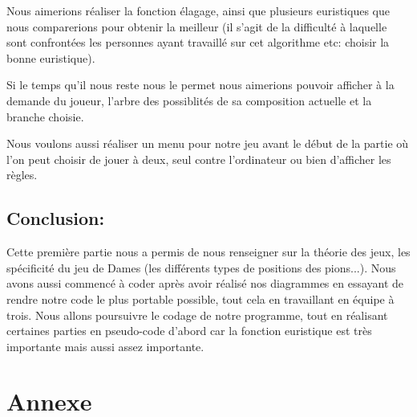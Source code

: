\documentclass[12,french]{report}
\begin{document}
Nous aimerions réaliser la fonction élagage, ainsi que plusieurs euristiques
que nous comparerions pour obtenir la meilleur (il s'agit de la difficulté
à laquelle sont confrontées les personnes ayant travaillé sur cet
algorithme etc: choisir la bonne euristique).

Si le temps qu'il nous reste nous le permet nous aimerions pouvoir
afficher à la demande du joueur, l'arbre des possiblités de sa composition
actuelle et la branche choisie. 

Nous voulons aussi réaliser un menu pour notre jeu avant le début
de la partie où l'on peut choisir de jouer à deux, seul contre l'ordinateur
ou bien d'afficher les règles.

\section{Conclusion:}

Cette première partie nous a permis de nous renseigner sur la théorie
des jeux, les spécificité du jeu de Dames (les différents types de
positions des pions...). Nous avons aussi commencé à coder après avoir
réalisé nos diagrammes en essayant de rendre notre code le plus portable
possible, tout cela en travaillant en équipe à trois. Nous allons
poursuivre le codage de notre programme, tout en réalisant certaines
parties en pseudo-code d'abord car la fonction euristique est très
importante mais aussi assez importante.


\chapter*{Annexe}
\end{document}
